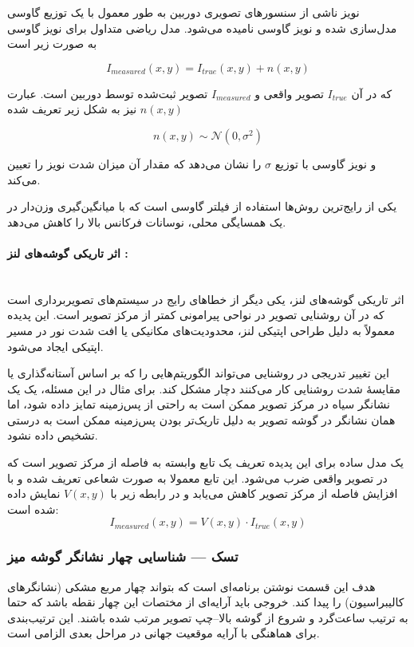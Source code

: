 \documentclass{article}
\begin{document}
 نویز ناشی از سنسورهای تصویری دوربین به طور معمول با یک توزیع گاوسی مدل‌سازی شده و نویز گاوسی نامیده می‌شود. مدل ریاضی متداول برای نویز گاوسی به صورت زیر است

\[
I_{measured}(x,y) = I_{true}(x,y) + n(x,y)
\]

که در آن $I_{true}$ تصویر واقعی و $I_{measured}$ تصویر ثبت‌شده توسط دوربین است. عبارت $n(x,y)$ نیز به شکل زیر تعریف شده  

\[
n(x,y) \sim \mathcal{N}(0,\sigma^2)
\]

و نویز گاوسی با توزیع $\sigma$ را نشان می‌دهد که مقدار آن میزان شدت نویز را تعیین می‌کند.

یکی از رایج‌ترین روش‌ها استفاده از فیلتر گاوسی است که با میانگین‌گیری وزن‌دار در یک همسایگی محلی، نوسانات فرکانس بالا را کاهش می‌دهد.

\paragraph{اثر تاریکی گوشه‌های لنز :}\mbox{}\\
اثر تاریکی گوشه‌های لنز، یکی دیگر از خطاهای رایج در سیستم‌های تصویربرداری است که در آن روشنایی تصویر در نواحی پیرامونی کمتر از مرکز تصویر است. این پدیده معمولاً به دلیل طراحی اپتیکی لنز، محدودیت‌های مکانیکی یا افت شدت نور در مسیر اپتیکی ایجاد می‌شود.

این تغییر تدریجی در روشنایی می‌تواند الگوریتم‌هایی را که بر اساس آستانه‌گذاری یا مقایسهٔ شدت روشنایی کار می‌کنند دچار مشکل کند. برای مثال در این مسئله، یک یک نشانگر سیاه در مرکز تصویر ممکن است به راحتی از پس‌زمینه تمایز داده شود، اما همان نشانگر در گوشه تصویر به دلیل تاریک‌تر بودن پس‌زمینه ممکن است به درستی تشخیص داده نشود.

یک مدل ساده برای این پدیده تعریف یک تابع  وابسته به فاصله از مرکز تصویر است که در تصویر واقعی ضرب می‌شود. این تابع معمولا به صورت شعاعی تعریف شده و با افزایش فاصله از مرکز تصویر کاهش می‌یابد و در رابطه زیر با $V(x, y)$ نمایش داده شده است:
\[
I_{measured}(x,y) = V(x,y) \cdot I_{true}(x,y)
\]

\subsubsection{تسک  --- شناسایی چهار نشانگر گوشه میز}
هدف این قسمت نوشتن برنامه‌ای است که بتواند چهار مربع مشکی (نشانگرهای کالیبراسیون) را پیدا کند. خروجی باید آرایه‌ای از مختصات این چهار نقطه باشد که حتما به ترتیب ساعت‌گرد و شروع از گوشه بالا--چپ تصویر  مرتب شده باشند. این ترتیب‌بندی برای هماهنگی با آرایه موقعیت جهانی در مراحل بعدی الزامی‌ است.
\end{document}
